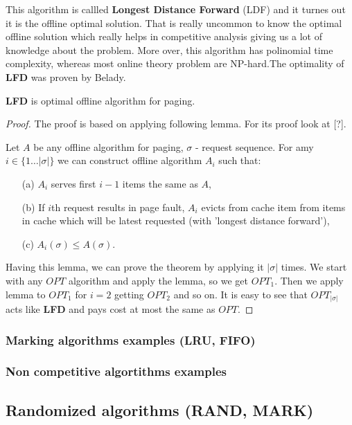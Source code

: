 This algorithm is callled \textbf{Longest Distance Forward} (LDF) and it turnes 
out it is the offline optimal solution. That is really uncommon to know the 
optimal offline solution which really helps in competitive analysis giving us 
a lot of knowledge about the problem. More over, this algorithm has polinomial 
time complexity, whereas most online theory problem are NP-hard.The optimality 
of \textbf{LFD} was proven by Belady.
\begin{theorem}
 \textbf{LFD} is optimal offline algorithm for paging.
\end{theorem}
\begin{proof}
 The proof is based on applying following lemma. For its proof look at [?].
\begin{lemma}
Let $A$ be any offline algorithm for paging, $\sigma$ - request sequence. For 
amy $i \in \{1 \ldots |\sigma|\}$ we can construct offline algorithm $A_i$ such 
that:
\begin{itemize}
 \item[(a)] $A_i$ serves first $i-1$ items the same as $A$,
 \item[(b)] If $i$th request results in page fault, $A_i$ evicts from cache 
item from items in cache which will be latest requested (with 'longest distance 
forward'),
  \item[(c)] $A_i(\sigma) \leq A(\sigma)$.
\end{itemize}
\end{lemma}
Having this lemma, we can prove the theorem by applying it $|\sigma|$ times. 
We start with any $OPT$ algorithm and apply the lemma, so we get $OPT_1$. Then 
we apply lemma to $OPT_1$ for $i=2$ getting $OPT_2$ and so on. It is easy to 
see that $OPT_{|\sigma|}$ acts like \textbf{LFD} and pays cost at most the 
same 
as $OPT$.
\end{proof}

\subsubsection{Marking algorithms examples (LRU, FIFO)}
\subsubsection{Non competitive algortithms examples}

\subsection{Randomized algorithms (RAND, MARK)}